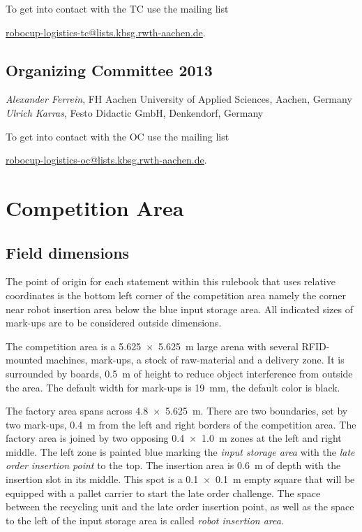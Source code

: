\documentclass[12pt,twoside]{article}
\begin{document}
\medskip

\noindent
To get into contact with the TC use the mailing list\\
\centerline{\url{robocup-logistics-tc@lists.kbsg.rwth-aachen.de}.}

\subsection{Organizing Committee 2013} \label{sec:oc} \emph{Alexander
  Ferrein}, FH Aachen University of Applied Sciences,
Aachen, Germany\\
\emph{Ulrich Karras}, Festo Didactic GmbH, Denkendorf, Germany

\medskip

\noindent
To get into contact with the OC use the mailing list\\
\centerline{\url{robocup-logistics-oc@lists.kbsg.rwth-aachen.de}.}




\section{Competition Area} \label{sec:area}


\subsection{Field dimensions} \label{sec:competition-area} The point
of origin for each statement within this rulebook that uses relative
coordinates is the bottom left corner of the competition area namely
the corner near robot insertion area below the blue input storage
area. All indicated sizes of mark-ups are to be considered outside
dimensions.

The competition area is a \SI{5.625 x 5.625}{\metre} large arena with
several RFID-mounted machines, mark-ups, a stock of raw-material and a
delivery zone. It is surrounded by boards, \SI{0.5}{\metre} of height
to reduce object interference from outside the area. The default width
for mark-ups is \SI{19}{\milli\metre}, the default color is black.

The factory area spans across \SI{4.8 x 5.625}{\metre}. There are two
boundaries, set by two mark-ups, \SI{0.4}{\metre} from the left and
right borders of the competition area. The factory area is joined by
two opposing \SI{0.4 x 1.0}{\metre} zones at the left and right
middle. The left zone is painted blue marking the \textit{input
  storage area} with the \textit{late order insertion point} to the
top. The insertion area is \SI{0.6}{\metre} of depth with the
insertion slot in its middle. This spot is a \SI{0.1 x 0.1}{\metre}
empty square that will be equipped with a pallet carrier to start the
late order challenge. The space between the recycling unit and the
late order insertion point, as well as the space to the left of the
input storage area is called \textit{robot insertion area}.
\end{document}
